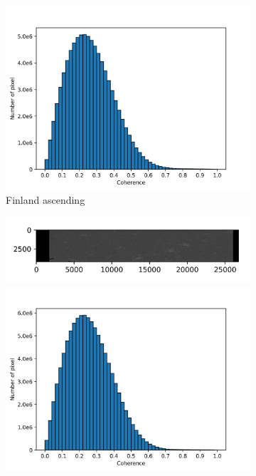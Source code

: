 \documentclass[a4paper,fleqn]{cas-sc}
\begin{document}
\begin{figure}
\begin{subfigure}{0.5\textwidth}
\begin{minipage}{0.5\textwidth}
            \includegraphics[width=\textwidth]{figure/The coherence/coh_Finland_asc_esd1_histogram_.png}
        \end{minipage}
        \caption{Finland ascending}
        \label{fig_6h}
    \end{subfigure}%
    \begin{subfigure}{0.5\textwidth}
        \centering
        \begin{minipage}{0.5\textwidth}
            \centering
            \includegraphics[width=\textwidth]{figure/The coherence/coh_Finland_des_esd1.png}
        \end{minipage}%
        \begin{minipage}{0.5\textwidth}
            \centering
            \includegraphics[width=\textwidth]{figure/The coherence/coh_Finland_des_esd1_histogram_.png}

\end{minipage}
\end{subfigure}
\end{figure}
\end{document}
